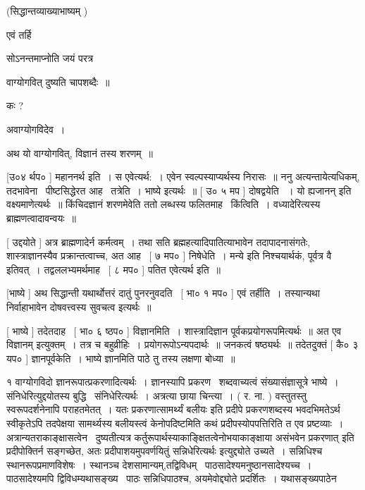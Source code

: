 \documentclass[11pt, openany]{book}
\begin{document}
 (सिद्धान्तव्याख्याभाष्यम् ) 

एवं तर्हि \textendash\ 

सोऽनन्तमाप्नोति जयं परत्र 

वाग्योगवित् दुष्यति चापशब्दैः~॥ 

कः ? 

अवाग्योगविदेव~। 

अथ यो वाग्योगवित्, विज्ञानं तस्य शरणम्~॥ 



 [उ०४ र्थप० ] महाननर्थ इति~। स एवेत्यर्थ:~। एवेन
स्वल्पस्याप्यर्थस्य निरासः~॥ ननु अत्यन्तायेत्यधिकम्, तदभावेना \textendash\ 
पीष्टसिद्धेरत आह \textendash\ तत्रेति~। भाष्ये इत्यर्थः~॥ [ उ० ५ मप ] दोषद्वयेति
~। {\qt यो ह्यजानन्} इति वक्ष्यमाणेत्यर्थः~॥ किंचिदज्ञानं शरणमेवेति ततो
लब्धस्य फलितमाह \textendash\ किंत्विति~। वध्यादेरित्यस्य ब्राह्मणत्वादावन्वयः~॥ 

 [ उद्दयोते ] अत्र ब्राह्मणादेर्न कर्मत्वम्~। तथा सति
ब्रह्महत्यादिपातित्याभावेन तदापादनासंगतेः, शास्त्राज्ञानस्यैव
प्रक्रान्तत्वाच्च, अत आह \textendash\ [ ७ मप० ] निषेधेति~। {\qt मन्ये} इति
निश्चयार्थकं, पूर्वत्र {\qt वै} इतिवत्~। तद्वललभ्यमर्थमाह \textendash\ [ ८ मप० ]
पतित एवेत्यर्थ इति~॥ 

 [भाष्ये ] अथ सिद्धान्ती यथार्थोत्तरं दातुं पुनरनुवदति \textendash\ [ भा० १
मप० ] एवं तर्हीति~। तस्यान्यथा निर्वाहाभावेन दोषवत्त्वस्य सुवचत्व
इत्यर्थः~॥ 

 [ भाष्ये ] तदेतदाह \textendash\ [ भा० ६ ष्ठप० ] विज्ञानमिति~। 
शास्त्रादिज्ञान पूर्वकप्रयोगरूपमित्यर्थः~॥ अत एव {\qt विज्ञानम्}
इत्युक्तम्~। तत्र च बहुव्रीहिः~। प्रयोगरूपोऽन्यपदार्थः~॥ जनकत्वं
षष्ठ्यर्थः~॥ तदेतदुक्तं [ कै० ३ यप० ] ज्ञानपूर्वकेति~। भाष्ये
ज्ञानमिति पाठे तु तस्य लक्षणा बोध्या~॥ 



१ वाग्योगविदो ज्ञानरूपात्प्रकरणादित्यर्थः~। ज्ञानस्यापि प्रकरण \textendash\ 
शब्दवाच्यत्वं संख्यासंज्ञासूत्रे भाष्ये~। संनिधेरित्युद्दयोतस्य बुद्धि \textendash\ 
संनिधेरित्यर्थः~। अत्रत्या छाया चिन्त्या~। ( र. ना. ) वस्तुतस्तु
स्वरूपदर्शनेनापि पराहतमेतत्~। यतः {\qt प्रकरणात्सामर्थ्यं बलीयः} इति प्रदीपे
प्रकरणशब्दस्य भवदभिमतेऽर्थ स्वीकृतेऽपि तदपेक्षया सामर्थ्यस्य बलीयस्त्वं
केनोपदिष्टमिति कथं प्रदीपस्योपपत्तिरिति त एव प्रष्टव्याः~। 
अत्रान्यतराकाङ्क्षासत्वेन \textendash\ दुष्यतीत्यत्र
कर्तुरूपार्थस्याकाङ्क्षितत्वेनोभयाकाङ्क्षाया असंभवेन {\qt प्रकरणात्} इति
प्रदीपोक्तिर्न सङ्गच्छेत, अतः प्रदीपाशयमुपवर्णयितुं {\qt सन्निधेरित्यर्थः}
इत्युद्द्योते उच्यते~। सन्निधिश्च स्थानरूपप्रमाणविशेषः~। स्थानञ्च
देशसामान्यम्,तद्विविधम् \textendash\ पाठसादेश्यमनुष्ठानसादेश्यच्च~। पाठसादेश्यमपि
द्विविधम्यथासङ्ख्य \textendash\ पाठः सन्निधिपाठश्च, अयमेवोद्द्योते प्रदर्शितः~। 
यथासङ्ख्यपाठेन \textendash\ 
\end{document}
